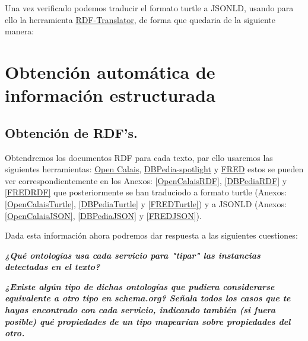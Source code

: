 \documentclass[spanish]{llncs}   %
\begin{document}
Una vez verificado podemos traducir el formato turtle a JSONLD, usando para ello la herramienta \href{https://rdf-translator.appspot.com}{RDF-Translator}, de forma que quedaria de la siguiente manera:




\section{Obtención automática de información estructurada}

\subsection{Obtención de RDF's.}

Obtendremos los documentos RDF para cada texto, par ello usaremos las siguientes herramientas: 
\href{https://www.refinitiv.com/en/products/intelligent-tagging-text-analytics}{Open Calais}, 
\href{https://www.dbpedia-spotlight.org/demo/}{DBPedia-spotlight} y 
\href{http://wit.istc.cnr.it/stlab-tools/fred/demo/?}{FRED} 
estos se pueden ver correspondientemente en los Anexos: \ref{OpenCalaisRDF}, \ref{DBPediaRDF} y \ref{FREDRDF} 
que posteriormente se han traduciodo a formato turtle (Anexos: \ref{OpenCalaisTurtle}, \ref{DBPediaTurtle} y \ref{FREDTurtle})
y a JSONLD (Anexos: \ref{OpenCalaisJSON}, \ref{DBPediaJSON} y \ref{FREDJSON}).

Dada esta información ahora podremos dar respuesta a las siguientes cuestiones:

\textbf{\textit{¿Qué ontologías usa cada servicio para "tipar" las instancias detectadas en el texto?}}

\textbf{\textit{¿Existe algún tipo de dichas ontologías que pudiera considerarse equivalente a otro tipo en schema.org? 
Señala todos los casos que te hayas encontrado con cada servicio, indicando también (si fuera posible) qué propiedades 
de un tipo mapearían sobre propiedades del otro.}}
\end{document}
